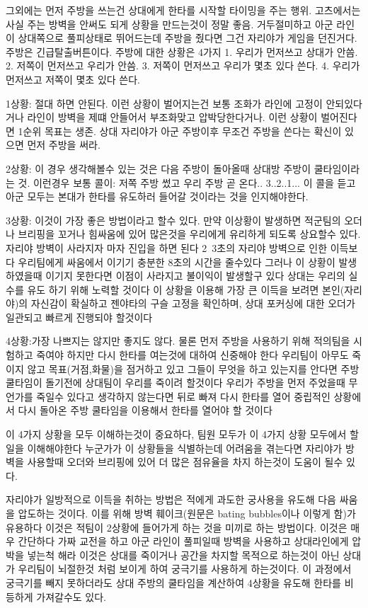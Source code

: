그외에는 먼저 주방을 쓰는건 상대에게 한타를 시작할 타이밍을 주는 행위.
고츠에서는 사실 주는 방벽을 안써도 되게 상황을 만드는것이 정말 좋음.
거두절미하고 아군 라인이 상대쪽으로 풀피상태로 뛰어드는데 주방을 줬다면 그건 자리야가 게임을 던진거다. 주방은 긴급탈출버튼이다.
주방에 대한 상황은 4가지
1. 우리가 먼저쓰고 상대가 안씀. 
2. 저쪽이 먼저쓰고 우리가 안씀. 
3. 저쪽이 먼저쓰고 우리가 몇초 있다 쓴다. 
4. 우리가 먼저쓰고 저쪽이 몇초 있다 쓴다.

1상황: 절대 하면 안된다. 이런 상황이 벌어지는건 보통 조화가 라인에 고정이 안되있다거나 라인이 방벽을 제떄 안들어서 부조화맞고 압박당한다거나.
이런 상황이 벌어진다면 1순위 목표는 생존.
상대 자리야가 아군 주방이후 무조건 주방을 쓴다는 확신이 있으면 먼저 주방을 써라.

2상황: 이 경우 생각해볼수 있는 것은 다음 주방이 돌아올때 상대방 주방이 쿨타임이라는 것.
이런경우 보통 콜이: 저쪽 주방 썼고 우리 주방 곧 온다.. 3..2..1...
이 콜을 듣고 아군 모두는 본대가 한타를 유도하러 들어갈 것이라는 것을 인지해야한다.

3상황: 이것이 가장 좋은 방법이라고 할수 있다.
만약 이상황이 발생하면 적군팀의 오더나 브리핑을 꼬거나 힘싸움에 있어 많은것을 우리에게 유리하게 되도록 상요할수 있다.
자리야 방벽이 사라지자 마자 진입을 하면 된다 2~3초의 자리야 방벽으로 인한 이득보다 우리팀에게 싸움에서 이기기 충분한 8초의 시간을 줄수있다
그러나 이 상황이 발생하였을때 이기지 못한다면 이점이 사라지고 불이익이 발생할구 있다 상대는 우리의 실수를 유도 하기 위해 노력할 것이다
이 상황을 이용해 가장 큰 이득을 보려면 본인(자리야)의 자신감이 확실하고 젠야타의 구슬 고정을 확인하며, 상대 포커싱에 대한 오더가 일관되고 빠르게 진행되야 할것이다

4상황:가장 나쁘지는 않지만 좋지도 않다. 물론 먼저 주방을 사용하기 위해 적의팀을 시험하고 죽여야 하지만 다시 한타를 여는것에 대하여 신중해야 한다
우리팀이 아무도 죽이지 않고 목표(거점,화물)을 점거하고 있고 그들이 무엇을 하고 있는지를 안다면 주방 쿨타임이 돌기전에 상대팀이 우리를 죽이려 할것이다
우리가 주방을 먼저 주었을때 무언가를 죽일수 있다고 생각하지 않는다면 뒤로 빠져 다시 한타를 열어 중립적인 상황에서 다시 돌아온 주방 쿨타임을 이용해서 
한타를 열어야 할 것이다

이 4가지 상황을 모두 이해하는것이 중요하다,
팀원 모두가 이 4가지 상황 모두에서 할 일을 이해해야한다
누군가가 이 상황들을 식별하는데 어려움을 겪는다면
자리야가 방벽을 사용할때 오더와 브리핑에 있어 더 많은 점유율을 차지 하는것이 
도움이 될수 있다.

자리야가 일방적으로 이득을 취하는 방법은 적에게 과도한 궁사용을 유도해 다음 싸움을 압도하는 것이다.
이를 위해 방벽 훼이크(원문은 bating bubbles이나 이렇게 함)가 유용하다 이것은 적팀이 2상황에 들어가게 하는 것을 미끼로 하는 방법이다.
이것은 매우 간단하다 가짜 교전을 하고 아군 라인이 풀피일때 방벽을 사용하고 상대라인에게 압박을 넣는척 해라
이것은 상대를 죽이거나 공간을 차지할 목적으로 하는것이 아닌 상대가 우리팀이 뇌절한것 처럼 보이게 하여 궁극기를 사용하게 하는것이다.
이 과정에서 궁극기를 빼지 못하더라도 상대 주방의 쿨타임을 계산하여 4상황을 유도해 한타를 비등하게 가져갈수도 있다.

